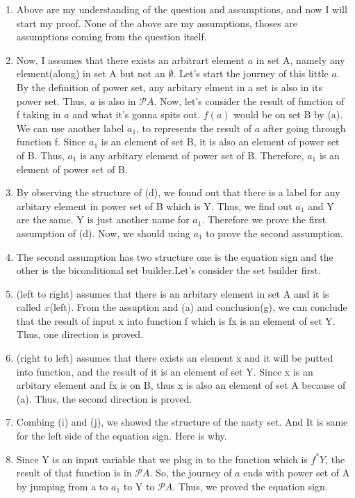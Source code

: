 \documentclass[10pt]{article}
\begin{document}
\begin{enumerate}
\begin{enumerate}
    \item Above are my understanding of the question and assumptions, and now I will start my proof. None of the above are my assumptions, thoses are assumptions coming from the question itself.
    \item Now, I assumes that there exists an arbitrart element $a$ in set A, namely any element(along) in set A but not an $\emptyset$. Let's start the journey of this little $a$. By the definition of power set, any arbitary elment in a set is also in its power set. Thus, $a$ is also in $\mathscr{P} A$. Now, let's consider the result of function of f taking in $a$ and what it's gonna spits out. $f(a)$ would be on set B by (a). We can use another label $a_{1}$, to represents the result of $a$ after going  
     through function f. Since $a_{1}$ is an element of set B, it is also an element of power set of B. Thus, $a_{1}$ is any arbitary element of power set of B. Therefore, $a_{1}$ is an element of power set of B. 
    \item By observing the structure of (d), we found out that there is a label for any arbitary element in power set of B which is Y. Thus, we find out $a_{1}$ and Y are the same. Y is just another name for $a_{1}$. Therefore we prove the first assumption of (d). Now, we should using $a_{1}$ to prove the second assumption.
    \item The second assumption has two structure one is the equation sign and the other is the biconditional set builder.Let's consider the set builder first. 
    \item (left to right) assumes that there is an arbitary element in set A and it is called $x$(left). From the assuption and (a) and conclusion(g), we can conclude that the result of input x into function f which is fx is an element of set Y. Thus, one direction is proved. 
    \item (right to left) assumes that there exists an element x and it will be putted into function, and the result of it is an element of set Y. Since x is an arbitary element and fx is on B, thus x is also an element of set A because of (a). Thus, the second direction is proved.
    \item Combing (i) and (j), we showed the structure of the nasty set. And It is same for the left side of the equation sign. Here is why. 
    \item Since Y is an input variable that we plug in to the function which is $f^{*}Y$, the result of that function is in  $\mathscr{P} A$. So, the journey of $a$ ends with power set of A by jumping from a to $a_{1}$ to Y to $\mathscr{P} A$. Thus, we proved the equation sign.

\end{enumerate}
\end{enumerate}
\end{document}
